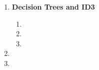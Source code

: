 \documentclass{article}
\begin{document}
\begin{enumerate}
\item \textbf{Decision Trees and ID3}
  \begin{enumerate}
  \item 
  \item 
  \item 
  \end{enumerate}
\item 
\item 
\end{enumerate}
\end{document}
